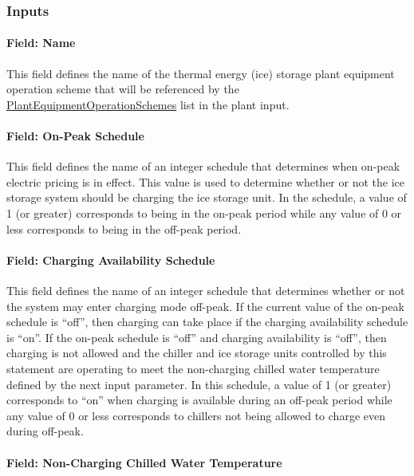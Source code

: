\subsubsection{Inputs}\label{inputs-13-009}

\paragraph{Field: Name}\label{field-name-7-013}

This field defines the name of the thermal energy (ice) storage plant equipment operation scheme that will be referenced by the \hyperref[plantequipmentoperationschemes]{PlantEquipmentOperationSchemes} list in the plant input.

\paragraph{Field: On-Peak Schedule}\label{field-on-peak-schedule}

This field defines the name of an integer schedule that determines when on-peak electric pricing is in effect. This value is used to determine whether or not the ice storage system should be charging the ice storage unit. In the schedule, a value of 1 (or greater) corresponds to being in the on-peak period while any value of 0 or less corresponds to being in the off-peak period.

\paragraph{Field: Charging Availability Schedule}\label{field-charging-availability-schedule}

This field defines the name of an integer schedule that determines whether or not the system may enter charging mode off-peak. If the current value of the on-peak schedule is ``off'', then charging can take place if the charging availability schedule is ``on''. If the on-peak schedule is ``off'' and charging availability is ``off'', then charging is not allowed and the chiller and ice storage units controlled by this statement are operating to meet the non-charging chilled water temperature defined by the next input parameter. In this schedule, a value of 1 (or greater) corresponds to ``on'' when charging is available during an off-peak period while any value of 0 or less corresponds to chillers not being allowed to charge even during off-peak.

\paragraph{Field: Non-Charging Chilled Water Temperature}\label{field-non-charging-chilled-water-temperature}


